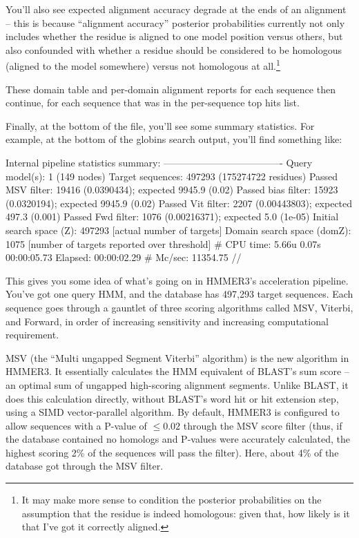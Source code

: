You'll also see expected alignment accuracy degrade at the ends of an
alignment -- this is because ``alignment accuracy'' posterior
probabilities currently not only includes whether the residue is
aligned to one model position versus others, but also confounded with
whether a residue should be considered to be homologous (aligned to
the model somewhere) versus not homologous at all.\footnote{It may
make more sense to condition the posterior probabilities on the
assumption that the residue is indeed homologous: given that, how
likely is it that I've got it correctly aligned.}


These domain table and per-domain alignment reports for each sequence
then continue, for each sequence that was in the per-sequence top hits
list.

Finally, at the bottom of the file, you'll see some summary
statistics.  For example, at the bottom of the globins search output,
you'll find something like:

\begin{sreoutput}
Internal pipeline statistics summary:
-------------------------------------
Query model(s):                            1  (149 nodes)
Target sequences:                     497293  (175274722 residues)
Passed MSV filter:                     19416  (0.0390434); expected 9945.9 (0.02)
Passed bias filter:                    15923  (0.0320194); expected 9945.9 (0.02)
Passed Vit filter:                      2207  (0.00443803); expected 497.3 (0.001)
Passed Fwd filter:                      1076  (0.00216371); expected 5.0 (1e-05)
Initial search space (Z):             497293  [actual number of targets]
Domain search space  (domZ):            1075  [number of targets reported over threshold]
# CPU time: 5.66u 0.07s 00:00:05.73 Elapsed: 00:00:02.29
# Mc/sec: 11354.75
//
\end{sreoutput}

This gives you some idea of what's going on in HMMER3's acceleration
pipeline. You've got one query HMM, and the database has 497,293
target sequences. Each sequence goes through a gauntlet of three
scoring algorithms called MSV, Viterbi, and Forward, in order of 
increasing sensitivity and increasing computational requirement. 

MSV (the ``Multi ungapped Segment Viterbi'' algorithm) is the new
algorithm in HMMER3. It essentially calculates the HMM equivalent of
BLAST's sum score -- an optimal sum of ungapped high-scoring alignment
segments. Unlike BLAST, it does this calculation directly, without
BLAST's word hit or hit extension step, using a SIMD vector-parallel
algorithm. By default, HMMER3 is configured to allow sequences with a
P-value of $\leq 0.02$ through the MSV score filter (thus, if the
database contained no homologs and P-values were accurately
calculated, the highest scoring 2\% of the sequences will pass the
filter). Here, about 4\% of the database got through the MSV filter.

